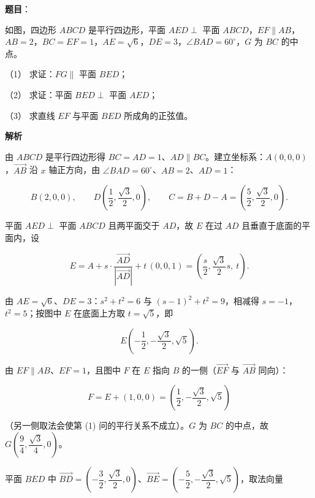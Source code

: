 \begin{answer}

\textbf{题目}：

如图，四边形 \(ABCD\) 是平行四边形，平面 \(AED\perp\) 平面 \(ABCD\)，\(EF\parallel AB\)，\(AB=2\)，\(BC=EF=1\)，\(AE=\sqrt{6}\)，\(DE=3\)，\(\angle BAD=60^{\circ}\)，\(G\) 为 \(BC\) 的中点。
\nopagebreak[4]
\begin{center}\end{center}
\nopagebreak[4]
（1） 求证：\(FG\parallel\) 平面 \(BED\)；

（2） 求证：平面 \(BED\perp\) 平面 \(AED\)；

（3） 求直线 \(EF\) 与平面 \(BED\) 所成角的正弦值。

\textbf{解析}

由 \(ABCD\) 是平行四边形得 \(BC=AD=1\)、\(AD\parallel BC\)。建立坐标系：\(A(0,0,0)\)，\(\overrightarrow{AB}\) 沿 \(x\) 轴正方向，由 \(\angle BAD=60^{\circ}\)、\(AB=2\)、\(AD=1\)：

\nopagebreak[4]
\[
B(2,0,0),\qquad D\left(\dfrac{1}{2},\dfrac{\sqrt{3}}{2},0\right),\qquad C=B+D-A=\left(\dfrac{5}{2},\dfrac{\sqrt{3}}{2},0\right).
\]

平面 \(AED\perp\) 平面 \(ABCD\) 且两平面交于 \(AD\)，故 \(E\) 在过 \(AD\) 且垂直于底面的平面内，设

\nopagebreak[4]
\[
E=A+s\cdot\dfrac{\overrightarrow{AD}}{|\overrightarrow{AD}|}+t\,(0,0,1)=\left(\dfrac{s}{2},\dfrac{\sqrt{3}}{2}s,\ t\right).
\]

由 \(AE=\sqrt{6}\)、\(DE=3\)：\(s^{2}+t^{2}=6\) 与 \((s-1)^{2}+t^{2}=9\)，相减得 \(s=-1\)，\(t^{2}=5\)；按图中 \(E\) 在底面上方取 \(t=\sqrt{5}\)，即

\nopagebreak[4]
\[
E\left(-\dfrac{1}{2},-\dfrac{\sqrt{3}}{2},\sqrt{5}\right).
\]

由 \(EF\parallel AB\)、\(EF=1\)，且图中 \(F\) 在 \(E\) 指向 \(B\) 的一侧（\(\overrightarrow{EF}\) 与 \(\overrightarrow{AB}\) 同向）：

\nopagebreak[4]
\[
F=E+(1,0,0)=\left(\dfrac{1}{2},-\dfrac{\sqrt{3}}{2},\sqrt{5}\right)
\]

（另一侧取法会使第 (1) 问的平行关系不成立）。\(G\) 为 \(BC\) 的中点，故 \(G\left(\dfrac{9}{4},\dfrac{\sqrt{3}}{4},0\right)\)。


平面 \(BED\) 中 \(\overrightarrow{BD}=\left(-\dfrac{3}{2},\dfrac{\sqrt{3}}{2},0\right)\)、\(\overrightarrow{BE}=\left(-\dfrac{5}{2},-\dfrac{\sqrt{3}}{2},\sqrt{5}\right)\)，取法向量


\end{answer}
